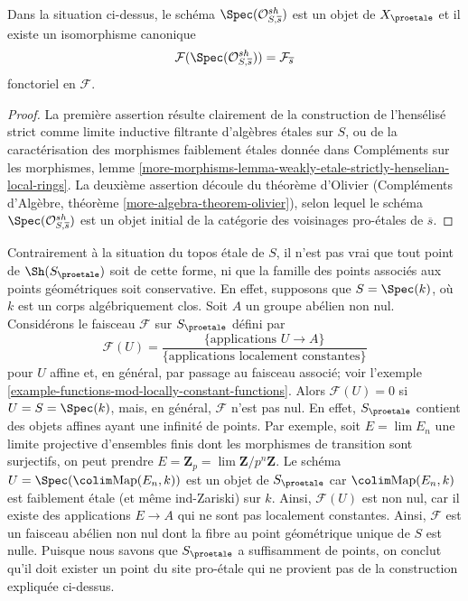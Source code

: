 \begin{lemma}
\label{lemma-classical-point}
Dans la situation ci-dessus, le schéma $\Spec(\mathcal{O}_{S, \overline{s}}^{sh})$
est un objet de $X_\proetale$ et il existe un isomorphisme canonique
$$
\mathcal{F}(\Spec(\mathcal{O}_{S, \overline{s}}^{sh})) =
\mathcal{F}_{\overline{s}}
$$
fonctoriel en $\mathcal{F}$.
\end{lemma}

\begin{proof}
La première assertion résulte clairement de la construction de l'hensélisé strict
comme limite inductive filtrante d'algèbres \'etales sur $S$, ou de la caractérisation
des morphismes faiblement \'etales donnée dans
Compléments sur les morphismes, lemme
\ref{more-morphisms-lemma-weakly-etale-strictly-henselian-local-rings}.
La deuxième assertion découle du théorème d'Olivier
(Compléments d'Algèbre, théorème \ref{more-algebra-theorem-olivier}),
selon lequel le schéma $\Spec(\mathcal{O}_{S, \overline{s}}^{sh})$
est un objet initial de la catégorie des voisinages pro-\'etales
de $\overline{s}$.
\end{proof}

\noindent
Contrairement à la situation du topos \'etale de $S$, il n'est pas vrai
que tout point de $\Sh(S_\proetale)$ soit de cette forme, ni que
la famille des points associés aux points géométriques soit
conservative. En effet, supposons que $S = \Spec(k)$, où $k$ est un
corps algébriquement clos. Soit $A$ un groupe abélien non nul.
Considérons le faisceau $\mathcal{F}$ sur $S_\proetale$ défini par
$$
\mathcal{F}(U) =
\frac{\{\text{applications }U \to A\}}{\{\text{applications localement constantes}\}}
$$
pour $U$ affine et, en général, par passage au faisceau associé; voir
l'exemple \ref{example-functions-mod-locally-constant-functions}.
Alors $\mathcal{F}(U) = 0$ si $U = S = \Spec(k)$, mais, en général, $\mathcal{F}$
n'est pas nul. En effet, $S_\proetale$ contient des objets affines
ayant une infinité de points. Par exemple, soit $E = \lim E_n$
une limite projective d'ensembles finis dont les morphismes de transition sont surjectifs,
on peut prendre $E = \mathbf{Z}_p = \lim \mathbf{Z}/p^n\mathbf{Z}$. Le schéma
$U = \Spec(\colim \text{Map}(E_n, k))$ est un objet de $S_\proetale$
car $\colim \text{Map}(E_n, k)$ est faiblement \'etale (et même ind-Zariski)
sur $k$. Ainsi, $\mathcal{F}(U)$ est non nul, car il existe des applications $E \to A$
qui ne sont pas localement constantes.
Ainsi, $\mathcal{F}$ est un faisceau abélien non nul dont la fibre au
point géométrique unique de $S$ est nulle. Puisque nous savons que $S_\proetale$
a suffisamment de points, on conclut qu'il doit exister un point du site pro-\'etale
qui ne provient pas de la construction expliquée ci-dessus.

